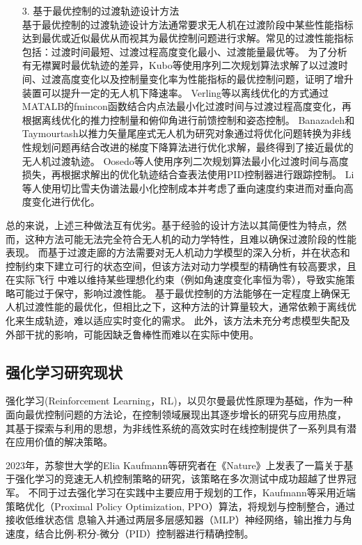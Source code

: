 \begin{itemize}
    \item [3.]基于最优控制的过渡轨迹设计方法\\
    \hspace*{2em}基于最优控制的过渡轨迹设计方法通常要求无人机在过渡阶段中某些性能指标达到最优或近似最优从而视其为最优控制问题进行求解。常见的过渡性能指标包括：过渡时间最短、过渡过程高度变化最小、过渡能量最优等。
    为了分析有无襟翼时最优轨迹的差异，Kubo等使用序列二次规划算法求解了以过渡时间、过渡高度变化以及控制量变化率为性能指标的最优控制问题，证明了增升装置可以提升一定的无人机下降速率\cite{kubo2008tail}。
    Verling等以离线优化的方式通过MATALB的fmincon函数结合内点法最小化过渡时间与过渡过程高度变化，再根据离线优化的推力控制量和俯仰角进行前馈控制和姿态控制\cite{verling2017model}。
    Banazadeh和Taymourtash以推力矢量尾座式无人机为研究对象通过将优化问题转换为非线性规划问题再结合改进的梯度下降算法进行优化求解，最终得到了接近最优的无人机过渡轨迹\cite{banazadeh2016optimal}。
    Oosedo等人使用序列二次规划算法最小化过渡时间与高度损失，再根据求解出的优化轨迹结合查表法使用PID控制器进行跟踪控制\cite{oosedo2017optimal}。
    Li等人使用切比雪夫伪谱法最小化控制成本并考虑了垂向速度约束进而对垂向高度变化进行优化\cite{li2020transition}。

\end{itemize}

总的来说，上述三种做法互有优劣。基于经验的设计方法以其简便性为特点，然而，这种方法可能无法完全符合无人机的动力学特性，且难以确保过渡阶段的性能表现。
而基于过渡走廊的方法需要对无人机动力学模型的深入分析，并在状态和控制约束下建立可行的状态空间，但该方法对动力学模型的精确性有较高要求，且在实际飞行
中难以维持某些理想化约束（例如角速度变化率恒为零），导致实施策略可能过于保守，影响过渡性能。
基于最优控制的方法能够在一定程度上确保无人机过渡性能的最优化，但相比之下，这种方法的计算量较大，通常依赖于离线优化来生成轨迹，难以适应实时变化的需求。
此外，该方法未充分考虑模型失配及外部干扰的影响，可能因缺乏鲁棒性而难以在实际中使用。

\subsection{强化学习研究现状}
强化学习(Reinforcement Learning，RL)，以贝尔曼最优性原理为基础，作为一种面向最优控制问题的方法论，在控制领域展现出其逐步增长的研究与应用热度，
其基于探索与利用的思想，为非线性系统的高效实时在线控制提供了一系列具有潜在应用价值的解决策略。

2023年，苏黎世大学的Elia Kaufmann等研究者在《Nature》上发表了一篇关于基于强化学习的竞速无人机控制策略的研究，该策略在多次测试中成功超越了世界冠军。
不同于过去强化学习在实践中主要应用于规划的工作，Kaufmann等采用近端策略优化（Proximal Policy Optimization, PPO）算法，将规划与控制整合，通过接收低维状态信
息输入并通过两层多层感知器（MLP）神经网络，输出推力与角速度，结合比例-积分-微分（PID）控制器进行精确控制\cite{kaufmann2023champion}。

